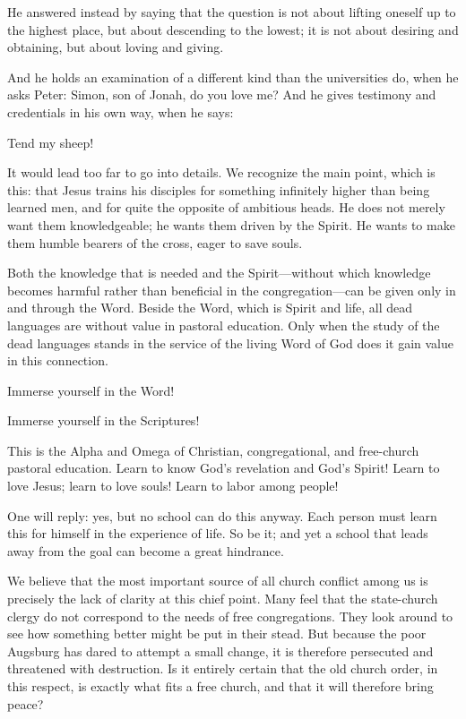He answered instead by saying that the question is not about lifting oneself up to the highest place, but about descending to the lowest; it is not about desiring and obtaining, but about loving and giving.

And he holds an examination of a different kind than the universities do, when he asks Peter: Simon, son of Jonah, do you love me? And he gives testimony and credentials in his own way, when he says: 

Tend my sheep!

It would lead too far to go into details. We recognize the main point, which is this: that Jesus trains his disciples for something infinitely higher than being learned men, and for quite the opposite of ambitious heads. He does not merely want them knowledgeable; he wants them driven by the Spirit. He wants to make them humble bearers of the cross, eager to save souls.

Both the knowledge that is needed and the Spirit—without which knowledge becomes harmful rather than beneficial in the congregation—can be given only in and through the Word. Beside the Word, which is Spirit and life, all dead languages are without value in pastoral education. Only when the study of the dead languages stands in the service of the living Word of God does it gain value in this connection.

Immerse yourself in the Word! 

Immerse yourself in the Scriptures! 

This is the Alpha and Omega of Christian, congregational, and free-church pastoral education. Learn to know God’s revelation and God’s Spirit! Learn to love Jesus; learn to love souls! Learn to labor among people!

One will reply: yes, but no school can do this anyway. Each person must learn this for himself in the experience of life. So be it; and yet a school that leads away from the goal can become a great hindrance.

We believe that the most important source of all church conflict among us is precisely the lack of clarity at this chief point. Many feel that the state-church clergy do not correspond to the needs of free congregations. They look around to see how something better might be put in their stead. But because the poor Augsburg has dared to attempt a small change, it is therefore persecuted and threatened with destruction. Is it entirely certain that the old church order, in this respect, is exactly what fits a free church, and that it will therefore bring peace?


